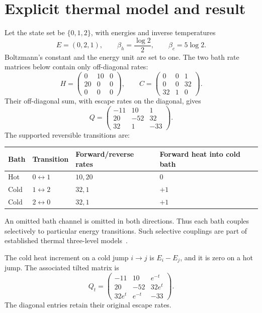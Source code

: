 \documentclass[11pt,a4paper]{article}
\begin{document}
\section{Explicit thermal model and result}
Let the state set be $\{0,1,2\}$, with energies and inverse temperatures
\begin{equation}
E=(0,2,1),\qquad \beta_h=\frac{\log2}{2},\qquad \beta_c=5\log2.
\label{eq:temperatures}
\end{equation}
Boltzmann's constant and the energy unit are set to one. The two bath rate matrices below contain only off-diagonal rates:
\begin{equation}
H=\begin{pmatrix}0&10&0\\20&0&0\\0&0&0\end{pmatrix},\qquad
C=\begin{pmatrix}0&0&1\\0&0&32\\32&1&0\end{pmatrix}.
\label{eq:baths}
\end{equation}
Their off-diagonal sum, with escape rates on the diagonal, gives
\begin{equation}
Q=\begin{pmatrix}-11&10&1\\20&-52&32\\32&1&-33\end{pmatrix}.
\label{eq:generator}
\end{equation}
The supported reversible transitions are:
\begin{center}
\begin{tabular}{llll}
\toprule
Bath & Transition & Forward/reverse rates & Forward heat into cold bath\\
\midrule
Hot & $0\leftrightarrow1$ & $10,20$ & $0$\\
Cold & $1\leftrightarrow2$ & $32,1$ & $+1$\\
Cold & $2\leftrightarrow0$ & $32,1$ & $+1$\\
\bottomrule
\end{tabular}
\end{center}
An omitted bath channel is omitted in both directions. Thus each bath couples selectively to particular energy transitions. Such selective couplings are part of established thermal three-level models~\cite{segal2018}.

The cold heat increment on a cold jump $i\to j$ is $E_i-E_j$, and it is zero on a hot jump. The associated tilted matrix is
\begin{equation}
Q_t=\begin{pmatrix}
-11&10&e^{-t}\\
20&-52&32e^t\\
32e^t&e^{-t}&-33
\end{pmatrix}.
\label{eq:tilt}
\end{equation}
The diagonal entries retain their original escape rates.
\end{document}
